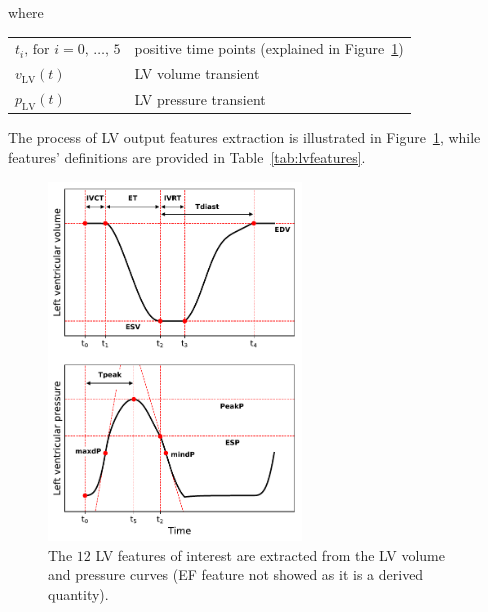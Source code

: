 \noindent
where

\vspace{0.2cm}
\begin{tabular}{ll}
    $t_i,\,\text{for}\,\,i=0,\,\dots,\,5$ & positive time points (explained in Figure~\ref{fig:lvfeatsextraction}) \\
    $v_{\textrm{LV}}(t)$ & LV volume transient \\
    $p_{\textrm{LV}}(t)$ & LV pressure transient
\end{tabular}

\vspace{0.2cm}\noindent
The process of LV output features extraction is illustrated in Figure~\ref{fig:lvfeatsextraction}, while features' definitions are provided in Table~\ref{tab:lvfeatures}.

\begin{figure}[!ht]
    \myfloatalign
    \includegraphics[width=0.6\textwidth]{figures/chapter03/lvv_lvp_features_explained_together.pdf}
    \caption{The $12$ LV features of interest are extracted from the LV volume and pressure curves (EF feature not showed as it is a derived quantity).}
    \label{fig:lvfeatsextraction}
\end{figure}
    
